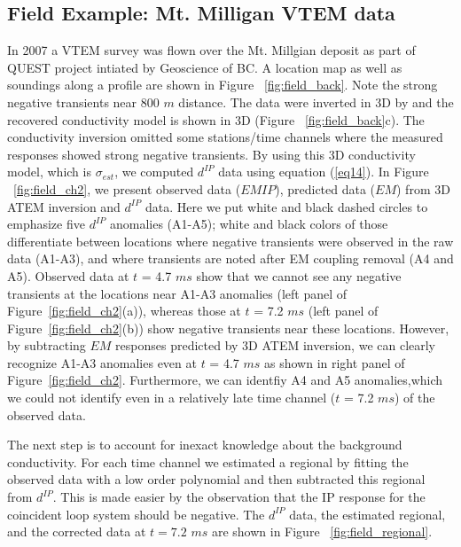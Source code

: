 \documentclass{segabs}
\begin{document}
\subsection{Field Example: Mt. Milligan VTEM data}
In 2007 a  VTEM survey was flown over the Mt. Millgian deposit as part of QUEST project intiated by Geoscience of BC. A location map as well as soundings along a profile are shown in Figure ~\ref{fig:field_back}. Note the strong negative transients near 800 $m$ distance. The data were inverted in 3D by \cite{yang20143} and the recovered conductivity model is shown in 3D (Figure ~\ref{fig:field_back}c). The conductivity inversion omitted some stations/time channels where the measured responses showed strong negative transients.  By using this 3D conductivity model, which is $\sigma_{est}$, we computed $d^{IP}$ data using equation (\ref{eq14}). In Figure ~\ref{fig:field_ch2}, we present observed data ($EMIP$), predicted data ($EM$) from 3D ATEM inversion and $d^{IP}$ data. Here we put white and black dashed circles to emphasize five $d^{IP}$ anomalies (A1-A5); white and black colors of those differentiate between locations where negative transients were observed in the raw data (A1-A3), and where transients are noted after EM coupling removal (A4 and A5). Observed data at $t$ = 4.7 $ms$ show that we cannot see any negative transients at the locations near A1-A3 anomalies (left panel of Figure~\ref{fig:field_ch2}(a)), whereas those at $t$ = 7.2 $ms$ (left panel of Figure~\ref{fig:field_ch2}(b)) show negative transients near these locations. However, by subtracting $EM$ responses predicted by 3D ATEM inversion, we can clearly recognize A1-A3 anomalies even at $t$  = 4.7 $ms$ as shown in right panel of Figure~\ref{fig:field_ch2}. Furthermore, we can identfiy A4 and A5 anomalies,which we could not identify even in a relatively late time channel ($t$ = 7.2 $ms$) of the observed data.

The next step is to account for inexact knowledge about the background conductivity. For each time channel we estimated a regional by fitting the observed data with a low order polynomial and then subtracted this regional from $d^{IP}$. This is made easier by the observation that the IP response for the coincident loop system should be negative.  The $d^{IP}$ data, the estimated regional, and the corrected data at $t = 7.2$ $ms$ are shown in Figure ~\ref{fig:field_regional}.
\end{document}
